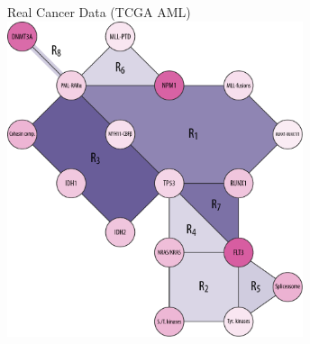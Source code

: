 \documentclass[mathserif]{beamer}
\begin{document}
\begin{frame}{Real Cancer Data (TCGA AML)}
\vspace{1em}
\centering
\includegraphics[width=0.65\textwidth]{figures/graph_aml.pdf}
\end{frame}
\end{document}
